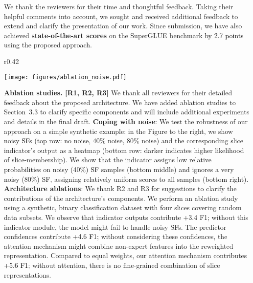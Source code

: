 \documentclass{article}
\newcommand{\num}[1]{\textcolor{black}{#1}}
\begin{document}
We thank the reviewers for their time and thoughtful feedback.
Taking their helpful comments into account, we sought and received additional feedback to extend and clarify the presentation of our work.
Since submission, we have also achieved \textbf{state-of-the-art scores} on the SuperGLUE benchmark \num{by 2.7 points} using the proposed approach.


\begin{wrapfigure}[12]{r}{0.42\textwidth}
\vspace{-1.5em}
    \begin{center}
        \texttt{[image: figures/ablation\_noise.pdf]}
    \end{center}
\label{fig:ablation_noise}
\end{wrapfigure}

\textbf{Ablation studies. [R1, R2, R3]}
We thank all reviewers for their detailed feedback about the proposed architecture. 
We have added ablation studies to Section~3.3 to clarify specific components and will include additional experiments and details in the final draft.
\textbf{Coping with noise}: We test the robustness of our approach on a simple synthetic example: in the Figure to the right, we show noisy SFs (top row: no noise, 40\% noise, 80\% noise) and the corresponding slice indicator's output as a heatmap (bottom row: darker indicates higher likelihood of slice-membership).
We show that the indicator assigns low relative probabilities on noisy (40\%) SF samples (bottom middle) and ignores a very noisy (80\%) SF, assigning relatively uniform scores to all samples (bottom right).
\textbf{Architecture ablations}: We thank R2 and R3 for suggestions to clarify the contributions of the architecture's components. 
We perform an ablation study using a synthetic, binary classification dataset with four slices covering random data subsets.
We observe that indicator outputs contribute \num{+3.4 F1}; without this indicator module, the model might fail to handle noisy SFs.
The predictor confidences contribute \num{+4.6 F1}; without considering these confidences, the attention mechanism might combine non-expert features into the reweighted representation. 
Compared to equal weights, our attention mechanism contributes \num{+5.6 F1}; without attention, there is no fine-grained combination of slice representations.
\end{document}
